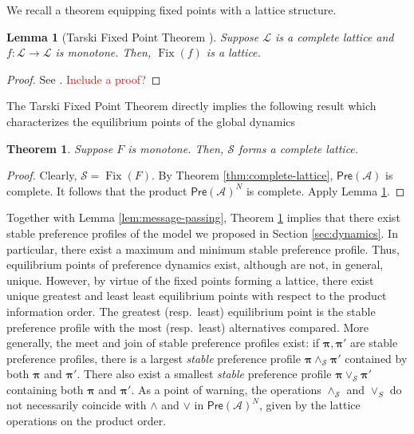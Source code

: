\documentclass[conference]{ieeeconf}
\newcommand{\A}{\mathcal{A}}
\renewcommand{\SS}{\mathcal{S}}
\newcommand{\Pref}{\mathsf{Pre}}
\renewcommand{\L}{\mathcal{L}}
\newcommand{\profile}{\boldsymbol{\pi}}
\newcommand{\join}{\vee}
\newcommand{\meet}{\wedge}
\newcommand{\bigjoin}{\bigvee}
\newcommand{\bigmeet}{\bigwedge}
\DeclareMathOperator{\Fix}{Fix}
\newtheorem{theorem}{Theorem}
\newtheorem{lemma}{Lemma}
\begin{document}

We recall a theorem equipping fixed points with a lattice structure.
\begin{lemma}[Tarski Fixed Point Theorem \cite{tarski1955}] \label{lem:tfpt}
    Suppose $\L$ is a complete lattice and $f: \L \to \L$ is monotone. Then, $\Fix(f)$ is a lattice.
\end{lemma}
\begin{proof}
    See \cite[Theorem 12.2]{roman2008}. \textcolor{red}{Include a proof?}
\end{proof}

The Tarski Fixed Point Theorem directly implies the following result which characterizes the equilibrium points of the global dynamics
\begin{theorem} \label{thm:dynamics}
    Suppose $F$ is monotone. Then, $\SS$ forms a complete lattice.
\end{theorem}
\begin{proof}
    Clearly, $\SS = \Fix(F)$. By Theorem \ref{thm:complete-lattice}, $\Pref(\A)$ is complete. It follows that the product $\Pref(\A)^N$ is complete. Apply Lemma \ref{lem:tfpt}.
\end{proof}

Together with Lemma \ref{lem:message-passing}, Theorem \ref{thm:dynamics} implies that there exist stable preference profiles of the model we proposed in Section \ref{sec:dynamics}. In particular, there exist a maximum and minimum stable preference profile. Thus, equilibrium points of preference dynamics exist, although are not, in general, unique. However, by virtue of the fixed points forming a lattice, there exist unique greatest and least least equilibrium points with respect to the product information order. The greatest (resp.~least) equilibrium point is the stable preference profile with the most (resp.~least) alternatives compared. More generally, the meet and join of stable preference profiles exist: if $\profile, \profile'$ are stable preference profiles, there is a largest \emph{stable} preference profile $\profile \meet_{\SS} \profile'$ contained by both $\profile$ and $\profile'$. There also exist a smallest \emph{stable} preference profile $\profile \join_{\SS} \profile'$ containing both $\profile$ and $\profile'$. As a point of warning, the operations $\meet_\SS$ and $\join_S$ do not necessarily coincide with $\meet$ and $\join$ in $\Pref(\A)^N$, given by the lattice operations on the product order.
\end{document}

